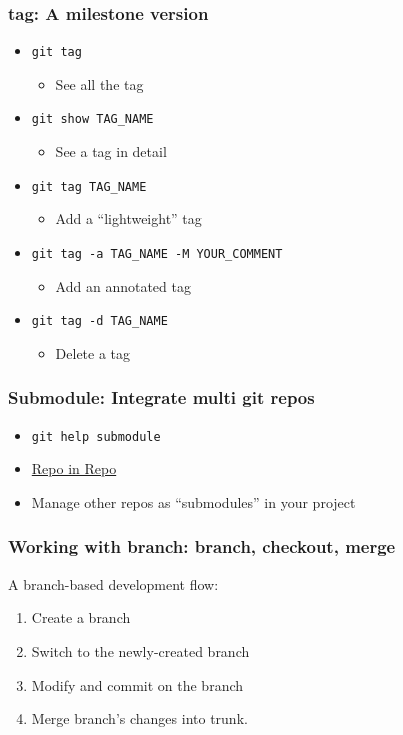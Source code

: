 \documentclass[11pt,ignorenonframetext,]{beamer}
\begin{document}
\begin{frame}\frametitle{tag: A milestone version}

\begin{itemize}
\item
  \texttt{git tag}
  \begin{itemize}
  \item
    See all the tag
  \end{itemize}
\item
  \texttt{git show TAG\_NAME}
  \begin{itemize}
  \item
    See a tag in detail
  \end{itemize}
\item
  \texttt{git tag TAG\_NAME}
  \begin{itemize}
  \item
    Add a ``lightweight'' tag
  \end{itemize}
\item
  \texttt{git tag -a TAG\_NAME -M YOUR\_COMMENT}
  \begin{itemize}
  \item
    Add an annotated tag
  \end{itemize}
\item
  \texttt{git tag -d TAG\_NAME}
  \begin{itemize}
  \item
    Delete a tag
  \end{itemize}
\end{itemize}
\end{frame}

\begin{frame}[fragile]\frametitle{Submodule: Integrate multi git repos}

\begin{itemize}
\item
  \texttt{git help submodule}
\item
  \href{http://progit.org/book/ch6-6.html}{Repo in Repo}
\item
  Manage other repos as ``submodules'' in your project
\end{itemize}
\end{frame}

\begin{frame}[label=gitbranch]\frametitle{Working with \textbf{branch}: branch, checkout,
merge}

A branch-based development flow:

\begin{enumerate}[1.]
\item
  Create a branch
\item
  Switch to the newly-created branch
\item
  Modify and commit on the branch
\item
  Merge branch's changes into trunk.
\end{enumerate}
\end{frame}
\end{document}
